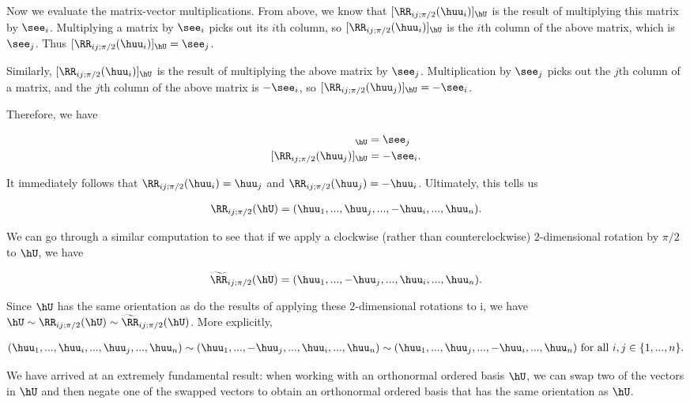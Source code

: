 \begin{deriv}
    Now we evaluate the matrix-vector multiplications. From above, we know that $[\RR_{ij;\pi/2}(\huu_i)]_{\hU}$ is the result of multiplying this matrix by $\see_i$. Multiplying a matrix by $\see_i$ picks out its $i$th column, so $[\RR_{ij;\pi/2}(\huu_i)]_{\hU}$ is the $i$th column of the above matrix, which is $\see_j$. Thus $[\RR_{ij;\pi/2}(\huu_i)]_{\hU} = \see_j$. 
    
    Similarly, $[\RR_{ij;\pi/2}(\huu_i)]_{\hU}$ is the result of multiplying the above matrix by $\see_j$. Multiplication by $\see_j$ picks out the $j$th column of a matrix, and the $j$th column of the above matrix is $-\see_i$, so $[\RR_{ij;\pi/2}(\huu_j)]_{\hU} = -\see_i$.
    
    Therefore, we have

    \begin{align*}
        [\RR_{ij;\pi/2}(\huu_i)]_{\hU} &= \see_j \\
        [\RR_{ij;\pi/2}(\huu_j)]_{\hU} &= -\see_i.
    \end{align*}

    It immediately follows that $\RR_{ij;\pi/2}(\huu_i) = \huu_j$ and $\RR_{ij;\pi/2}(\huu_j) = -\huu_i$. Ultimately, this tells us

    \begin{align*}
        \RR_{ij;\pi/2}(\hU) = (\huu_1, ..., \huu_j, ..., -\huu_i, ..., \huu_n).
    \end{align*}

    We can go through a similar computation to see that if we apply a clockwise (rather than counterclockwise) $2$-dimensional rotation by $\pi/2$ to $\hU$, we have

     \begin{align*}
        \widetilde{\RR}_{ij;\pi/2}(\hU) = (\huu_1, ..., -\huu_j, ..., \huu_i, ..., \huu_n).
    \end{align*}

    Since $\hU$ has the same orientation as do the results of applying these $2$-dimensional rotations to i, we have $\hU \sim \RR_{ij;\pi/2}(\hU) \sim \widetilde{\RR}_{ij;\pi/2}(\hU)$. More explicitly,
    
    \begin{align*}
        (\huu_1, ..., \huu_i, ..., \huu_j, ..., \huu_n)
        \sim
        (\huu_1, ..., -\huu_j, ..., \huu_i, ..., \huu_n)
        \sim
        (\huu_1, ..., \huu_j, ..., -\huu_i, ..., \huu_n) \text{ for all $i, j \in \{1, ..., n\}$}.
    \end{align*}

    We have arrived at an extremely fundamental result: when working with an orthonormal ordered basis $\hU$, we can swap two of the vectors in $\hU$ and then negate one of the swapped vectors to obtain an orthonormal ordered basis that has the same orientation as $\hU$.
\end{deriv}

